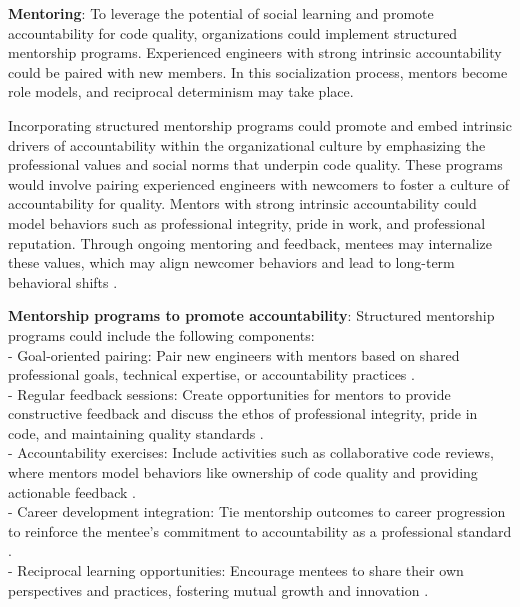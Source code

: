 \begin{tcolorbox}

\textbf{Mentoring}: To leverage the potential of social learning and promote accountability for code quality, organizations could implement structured mentorship programs. Experienced engineers with strong intrinsic accountability could be paired with new members. In this socialization process, mentors become role models, and reciprocal determinism may take place.

\end{tcolorbox}

Incorporating structured mentorship programs could promote and embed intrinsic drivers of accountability within the organizational culture by emphasizing the professional values and social norms that underpin code quality. These programs would involve pairing experienced engineers with newcomers to foster a culture of accountability for quality. Mentors with strong intrinsic accountability could model behaviors such as professional integrity, pride in work, and professional reputation. Through ongoing mentoring and feedback, mentees may internalize these values, which may align newcomer behaviors and lead to long-term behavioral shifts \citep{ragins2007handbook,johnson2004mentoring}.

\begin{tcolorbox}

\textbf{Mentorship programs to promote accountability}: Structured mentorship programs could include the following components:\\

- Goal-oriented pairing: Pair new engineers with mentors based on shared professional goals, technical expertise, or accountability practices \citep{ragins2007handbook}.\\

- Regular feedback sessions: Create opportunities for mentors to provide constructive feedback and discuss the ethos of professional integrity, pride in code, and maintaining quality standards \citep{ragins2007handbook,london2002feedback}.\\

- Accountability exercises: Include activities such as collaborative code reviews, where mentors model behaviors like ownership of code quality and providing actionable feedback \citep{london2002feedback}.\\

- Career development integration: Tie mentorship outcomes to career progression to reinforce the mentee's commitment to accountability as a professional standard \citep{allen2004career}.\\

- Reciprocal learning opportunities: Encourage mentees to share their own perspectives and practices, fostering mutual growth and innovation \citep{johnson2004mentoring}.\\

\end{tcolorbox}

